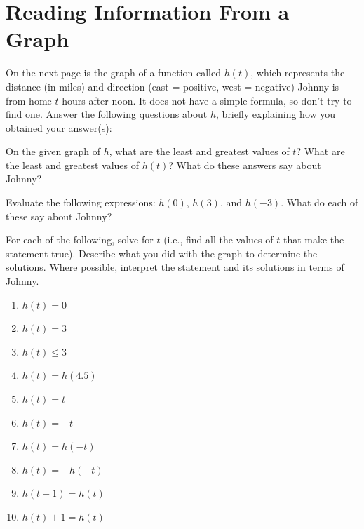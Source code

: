 \newpage
\section{Reading Information From a Graph}


On the next page is the graph of a function called $h(t)$, which
represents the distance (in miles) and direction (east = positive,
west = negative) Johnny is from home $t$ hours after noon. It does not
have a simple formula, so don't try to find one. Answer the following
questions about $h$, briefly explaining how you obtained your
answer(s):

\begin{prob}
On the given graph of $h$, what are the least and greatest values
of $t$? What are the least and greatest values of $h(t)$? What do
these answers say about Johnny?
\end{prob}

\begin{prob}
Evaluate the following expressions: $h(0)$, $h(3)$, and $h(-3)$. What
do each of these say about Johnny? 
\end{prob}

\begin{prob}
For each of the following, solve for $t$ (i.e., find all the values of
$t$ that make the statement true). Describe what you did with the
graph to determine the solutions.  Where possible, interpret
the statement and its solutions in terms of Johnny.

\begin{enumerate}
\item $h(t) = 0$
\item $h(t) = 3$
\item $h(t) \leq 3$
\item $h(t) = h(4.5)$
\item $h(t) = t$
\item $h(t) = -t$
\item $h(t) = h(-t)$
\item $h(t) = -h(-t)$
\item $h(t+1) = h(t)$
\item $h(t)+1 = h(t)$
\end{enumerate}
\end{prob}

\newpage

